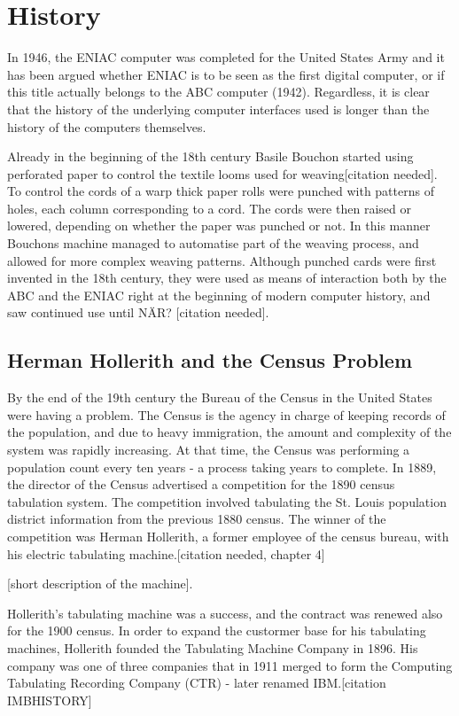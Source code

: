 \section{History}
In 1946, the ENIAC computer was completed for the United States Army and it has been argued whether ENIAC is to be seen as the first digital computer\cite{McCartney1999}, or if this title actually belongs to the ABC computer (1942)\cite{court}. Regardless, it is clear that the history of the underlying computer interfaces used is longer than the history of the computers themselves.

Already in the beginning of the 18th century Basile Bouchon started using perforated paper to control the textile looms used for weaving[citation needed]. To control the cords of a warp thick paper rolls were punched with patterns of holes, each column corresponding to a cord. The cords were then raised or lowered, depending on whether the paper was punched or not. In this manner Bouchons machine managed to automatise part of the weaving process, and allowed for more complex weaving patterns. Although punched cards were first invented in the 18th century, they were used as means of interaction both by the ABC and the ENIAC right at the beginning of modern computer history, and saw continued use until NÄR? [citation needed].



\subsection{Herman Hollerith and the Census Problem}
By the end of the 19th century the Bureau of the Census in the United States were having a problem. The Census is the agency in charge of keeping records of the population, and due to heavy immigration, the amount and complexity of the system was rapidly increasing. At that time, the Census was performing a population count every ten years - a process taking years to complete. In 1889, the director of the Census advertised a competition for the 1890 census tabulation system. The competition involved tabulating the St. Louis population district information from the previous 1880 census. The winner of the competition was Herman Hollerith, a former employee of the census bureau, with his electric tabulating machine.[citation needed, chapter 4]

[short description of the machine].

Hollerith's tabulating machine was a success, and the contract was renewed also for the 1900 census. In order to expand the custormer base for his tabulating machines, Hollerith founded the Tabulating Machine Company in 1896. His company was one of three companies that in 1911 merged to form the Computing Tabulating Recording Company (CTR) - later renamed IBM.[citation IMBHISTORY]

